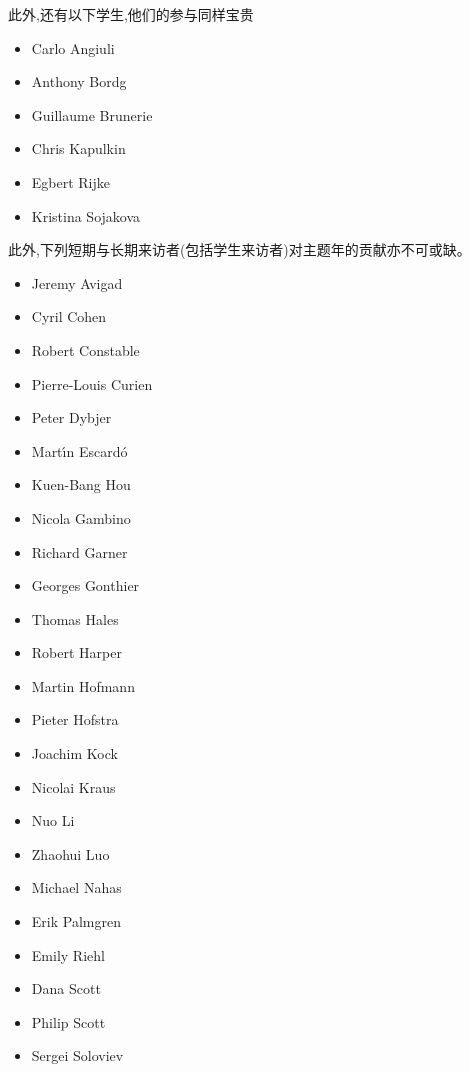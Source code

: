 \noindent 此外,还有以下学生,他们的参与同样宝贵

\begin{multicols}{\OPTprefacecols}{
\begin{itemize}
\item[] Carlo Angiuli
\item[] Anthony Bordg
\item[] Guillaume Brunerie
\item[] Chris Kapulkin
\item[] Egbert Rijke
\item[] Kristina Sojakova
\end{itemize}
}
\end{multicols}

\noindent 此外,下列短期与长期来访者(包括学生来访者)对主题年的贡献亦不可或缺。

\begin{multicols}{\OPTprefacecols}{
\begin{itemize}
\item[] Jeremy Avigad
\item[] Cyril Cohen
\item[] Robert Constable
\item[] Pierre-Louis Curien
\item[] Peter Dybjer
\item[] Mart{\'\i}n Escard{\'o}
\item[] Kuen-Bang Hou
\item[] Nicola Gambino
\item[] Richard Garner
\item[] Georges Gonthier
\item[] Thomas Hales
\item[] Robert Harper
\item[] Martin Hofmann
\item[] Pieter Hofstra
\item[] Joachim Kock
\item[] Nicolai Kraus
\item[] Nuo Li
\item[] Zhaohui Luo
\item[] Michael Nahas
\item[] Erik Palmgren
\item[] Emily Riehl
\item[] Dana Scott
\item[] Philip Scott
\item[] Sergei Soloviev
\end{itemize}
}
\end{multicols}

